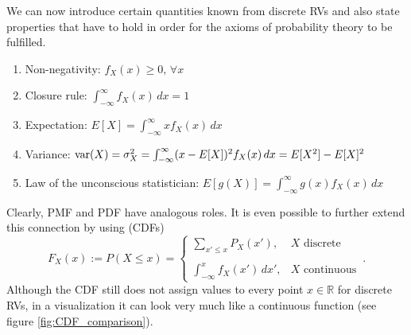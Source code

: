 We can now introduce certain quantities known from discrete RVs and also state properties that have to hold in order for the axioms of probability theory to be fulfilled.
\begin{prop}

\begin{enumerate}
\item Non-negativity: $f_X(x) \geq 0, \, \forall x$

\item Closure rule: $\int_{- \infty}^\infty f_X(x) \, dx = 1$

\item Expectation: $E[X] = \int_{- \infty}^\infty x f_X(x) \, dx$

\item Variance: $\operatorname{var}(X) = \sigma_X^2 = \int_{- \infty}^\infty (x - E[X])^2 f_X(x) \, dx = E[X^2] - E[X]^2$

\item Law of the unconscious statistician\footnotemark{}: $E[g(X)] = \int_{-\infty}^\infty g(x) f_X(x) \, dx$
\end{enumerate}
\end{prop}
Clearly, PMF and PDF have analogous roles. It is even possible to further extend this connection by using  (CDFs)
\begin{equation}
F_X(x) := P(X \leq x) = \begin{cases} \displaystyle \sum_{x' \leq x} P_X(x'), & X \text{ discrete} \\\\ \displaystyle \int_{- \infty}^x f_X(x') \, dx', & X \text{ continuous} \end{cases} \, .
\end{equation}
Although the CDF still does not assign values to every point $x \in \mathbb{R}$ for discrete RVs, in a visualization it can look very much like a continuous function (see figure \ref{fig:CDF_comparison}).



